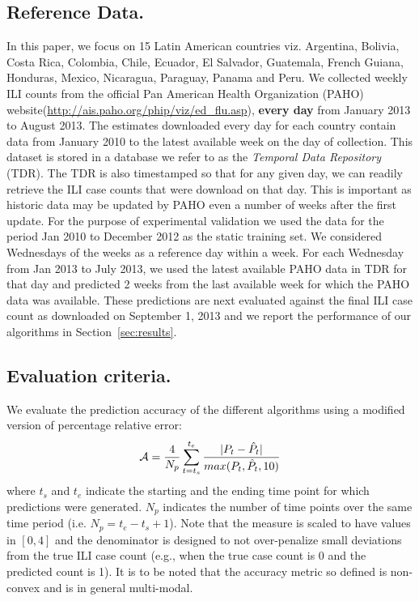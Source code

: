 
\subsection{Reference Data.}
In this paper, we focus on 15 Latin
American countries viz. Argentina, Bolivia, Costa Rica, Colombia, Chile,
Ecuador,  El Salvador, Guatemala, French Guiana, Honduras, Mexico, Nicaragua,
Paraguay, Panama and Peru. We collected weekly ILI counts
from the official Pan American Health Organization (PAHO)
website(\url{http://ais.paho.org/phip/viz/ed_flu.asp}), {\bf every day} from January 2013 to August 2013. The
estimates downloaded every day for each country contain data from January 2010 to the latest
available week on the day of collection. 
This dataset is stored in a database we refer to as
the {\it Temporal Data Repository} (TDR).  The TDR is also timestamped so that for
any given day, we can readily retrieve the ILI case
counts that were download on that day. This is important as historic data may be updated by
PAHO even a number of weeks after the first update.  For the purpose of experimental validation
we used the data for the period Jan 2010 to December 2012 as the static
training set. We considered Wednesdays of the weeks as a reference day within a week.  For
each Wednesday from Jan 2013 to July 2013, we used the latest available PAHO
data in TDR for that day and predicted 2 weeks from the last available week for
which the PAHO data was available. These predictions are next evaluated against
the final ILI case count as downloaded on September 1, 2013 and we report the
performance of our algorithms in Section~\ref{sec:results}. 

\subsection{Evaluation criteria.}
We evaluate the prediction accuracy of the
different algorithms using a modified version of percentage relative error:
\vspace{-1em}
\begin{equation} 
    \label{eq:def:accuracy} 
    \mathcal{A} = \frac{4}{N_p}\sum \limits_{t=t_s}^{t_e}\frac{|P_t -\hat{P}_t| }{max(P_t, \hat{P}_t, 10)}
    \vspace{-1em}
\end{equation} 
where $t_s$ and $t_e$ indicate the starting and the ending
time point for which predictions were generated.  $N_p$ indicates the number of
time points over the same time period (i.e. $N_p = t_e - t_s + 1$). Note that
the measure is scaled to have values in $[0,4]$ and the denominator is
designed to not over-penalize small deviations from the true ILI case count (e.g., when
the true case count is 0 and the predicted count is 1).
It is to be noted that the accuracy metric so defined is
non-convex and is in general multi-modal. 


